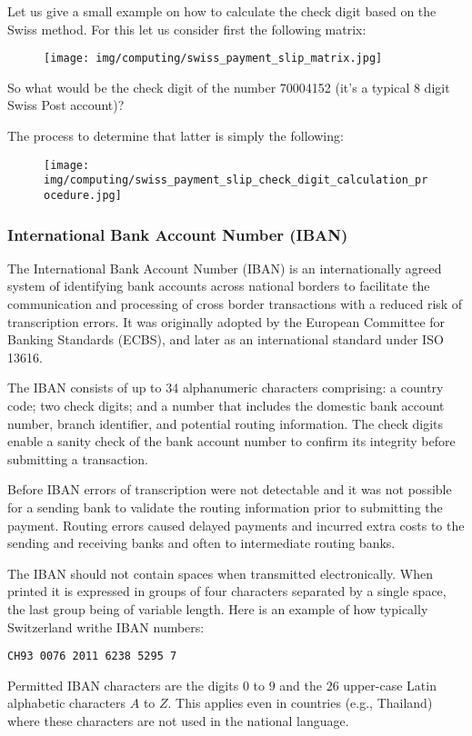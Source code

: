 	Let us give a small example on how to calculate the check digit based on the Swiss method. For this let us consider first the following matrix:
	\begin{figure}[H]
		\centering
		\texttt{[image: img/computing/swiss\_payment\_slip\_matrix.jpg]}
	\end{figure}
	So what would be the check digit of the number 70004152 (it's a typical 8 digit Swiss Post account)?
	
	The process to determine that latter is simply the following:
	\begin{figure}[H]
		\centering
		\texttt{[image: img/computing/swiss\_payment\_slip\_check\_digit\_calculation\_procedure.jpg]}
	\end{figure}
	
	\subsubsection{International Bank Account Number (IBAN)}
	The International Bank Account Number (IBAN) is an internationally agreed system of identifying bank accounts across national borders to facilitate the communication and processing of cross border transactions with a reduced risk of transcription errors. It was originally adopted by the European Committee for Banking Standards (ECBS), and later as an international standard under ISO 13616.

	The IBAN consists of up to 34 alphanumeric characters comprising: a country code; two check digits; and a number that includes the domestic bank account number, branch identifier, and potential routing information. The check digits enable a sanity check of the bank account number to confirm its integrity before submitting a transaction.

	Before IBAN errors of transcription were not detectable and it was not possible for a sending bank to validate the routing information prior to submitting the payment. Routing errors caused delayed payments and incurred extra costs to the sending and receiving banks and often to intermediate routing banks.

	The IBAN should not contain spaces when transmitted electronically. When printed it is expressed in groups of four characters separated by a single space, the last group being of variable length. Here is an example of how typically Switzerland writhe IBAN numbers:
	\begin{center}
		\texttt{CH93 0076 2011 6238 5295 7}
	\end{center}
	Permitted IBAN characters are the digits $0$ to $9$ and the $26$ upper-case Latin alphabetic characters $A$ to $Z$. This applies even in countries (e.g., Thailand) where these characters are not used in the national language.
	
